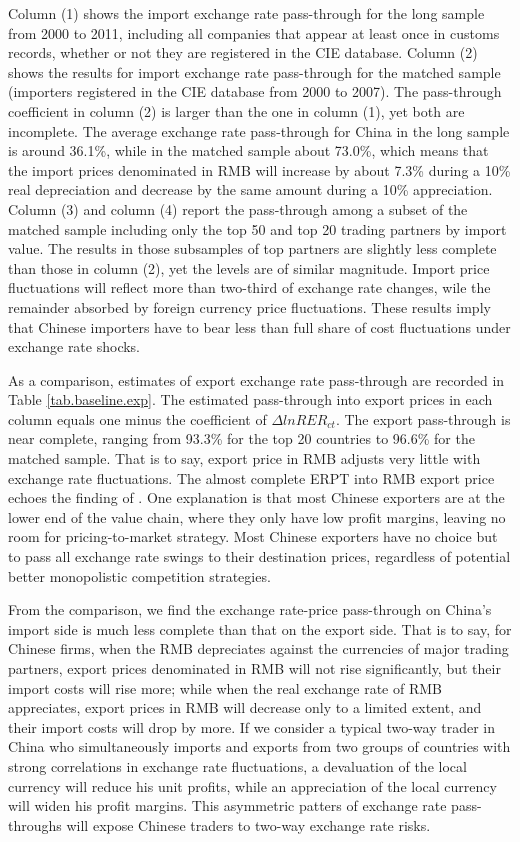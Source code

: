 \documentclass[12pt]{article}
\begin{document}
Column (1) shows the import exchange rate pass-through for the long sample from 2000 to 2011, including all companies that appear at least once in customs records, whether or not they are registered in the CIE database. Column (2) shows the results for import exchange rate pass-through for the matched sample (importers registered in the CIE database from 2000 to 2007). The pass-through coefficient in column (2) is larger than the one in column (1), yet both are incomplete. The average exchange rate pass-through for China in the long sample is around 36.1\%, while in the matched sample about 73.0\%, which means that the import prices denominated in RMB will increase by about 7.3\% during a 10\% real depreciation and decrease by the same amount during a 10\% appreciation. Column (3) and column (4) report the pass-through among a subset of the matched sample including only the top 50 and top 20 trading partners by import value. The results in those subsamples of top partners are slightly less complete than those in column (2), yet the levels are of similar magnitude. Import price fluctuations will reflect more than two-third of exchange rate changes, wile the remainder absorbed by foreign currency price fluctuations. These results imply that Chinese importers have to bear less than full share of cost fluctuations under exchange rate shocks. 

As a comparison, estimates of export exchange rate pass-through are recorded in Table \ref{tab.baseline.exp}. The estimated pass-through into export prices in each column equals one minus the coefficient of $\Delta lnRER_{ct}$. The export pass-through is near complete, ranging from 93.3\% for the top 20 countries to 96.6\% for the matched sample. That is to say, export price in RMB adjusts very little with exchange rate fluctuations. The almost complete ERPT into RMB export price echoes the finding of \cite{lmx2015}. One explanation is that most Chinese exporters are at the lower end of the value chain, where they only have low profit margins, leaving no room for pricing-to-market strategy. Most Chinese exporters have no choice but to pass all exchange rate swings to their destination prices, regardless of potential better monopolistic competition strategies.

From the comparison, we find the exchange rate-price pass-through on China's import side is much less complete than that on the export side. That is to say, for Chinese firms, when the RMB depreciates against the currencies of major trading partners, export prices denominated in RMB will not rise significantly, but their import costs will rise more; while when the real exchange rate of RMB appreciates, export prices in RMB will decrease only to a limited extent, and their import costs will drop by more. If we consider a typical two-way trader in China who simultaneously imports and exports from two groups of countries with strong correlations in exchange rate fluctuations, a devaluation of the local currency will reduce his unit profits, while an appreciation of the local currency will widen his profit margins. This asymmetric patters of exchange rate pass-throughs will expose Chinese traders to two-way exchange rate risks.
\end{document}
